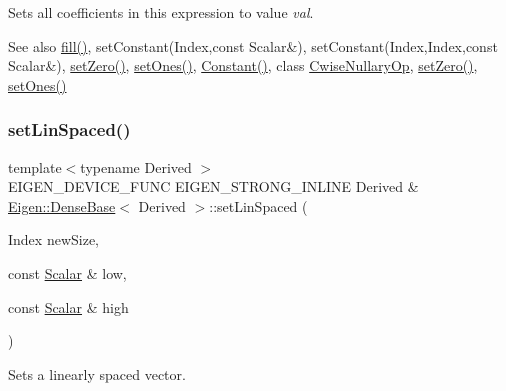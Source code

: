 Sets all coefficients in this expression to value {\itshape val}.

\begin{DoxySeeAlso}{See also}
\mbox{\hyperlink{class_eigen_1_1_dense_base_a4f5eb49e80db57f79a8353ecdf811418}{fill()}}, set\+Constant(\+Index,const Scalar\&), set\+Constant(\+Index,\+Index,const Scalar\&), \mbox{\hyperlink{class_eigen_1_1_dense_base_ac74411ddeea2545bf20baf14613be47e}{set\+Zero()}}, \mbox{\hyperlink{class_eigen_1_1_dense_base_ad18970fd7d9f9c3d8db9d05fa8652a25}{set\+Ones()}}, \mbox{\hyperlink{class_eigen_1_1_dense_base_ab0ae1bfa72faedcaf53af81ca76c446b}{Constant()}}, class \mbox{\hyperlink{class_eigen_1_1_cwise_nullary_op}{Cwise\+Nullary\+Op}}, \mbox{\hyperlink{class_eigen_1_1_dense_base_ac74411ddeea2545bf20baf14613be47e}{set\+Zero()}}, \mbox{\hyperlink{class_eigen_1_1_dense_base_ad18970fd7d9f9c3d8db9d05fa8652a25}{set\+Ones()}} 
\end{DoxySeeAlso}
\mbox{\label{class_eigen_1_1_dense_base_a17a69cfd1b44b64f26b1a0f00666a871}} 
\subsubsection{\texorpdfstring{setLinSpaced()}{setLinSpaced()}\hspace{0.1cm}{\footnotesize\ttfamily [1/2]}}
{\footnotesize\ttfamily template$<$typename Derived $>$ \\
E\+I\+G\+E\+N\+\_\+\+D\+E\+V\+I\+C\+E\+\_\+\+F\+U\+NC E\+I\+G\+E\+N\+\_\+\+S\+T\+R\+O\+N\+G\+\_\+\+I\+N\+L\+I\+NE Derived \& \mbox{\hyperlink{class_eigen_1_1_dense_base}{Eigen\+::\+Dense\+Base}}$<$ Derived $>$\+::set\+Lin\+Spaced (\begin{DoxyParamCaption}\item[{Index}]{new\+Size,  }\item[{const \mbox{\hyperlink{class_eigen_1_1_dense_base_a5feed465b3a8e60c47e73ecce83e39a2}{Scalar}} \&}]{low,  }\item[{const \mbox{\hyperlink{class_eigen_1_1_dense_base_a5feed465b3a8e60c47e73ecce83e39a2}{Scalar}} \&}]{high }\end{DoxyParamCaption})}



Sets a linearly spaced vector. 

